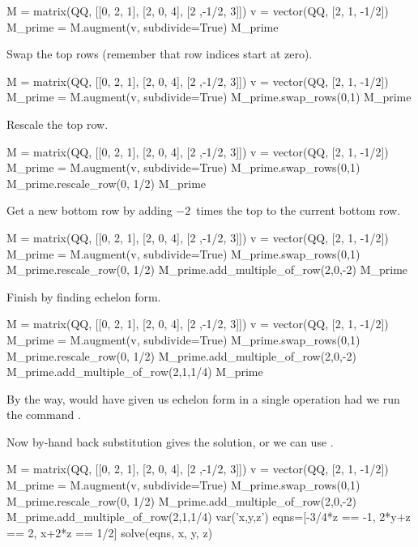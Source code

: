 \begin{sageoutput}
M = matrix(QQ, [[0, 2, 1], [2, 0, 4], [2 ,-1/2, 3]])
v = vector(QQ, [2, 1, -1/2])                        
M_prime = M.augment(v, subdivide=True)              
M_prime                                             
\end{sageoutput}
\noindent
Swap the top rows (remember that row indices start at zero).
\begin{sageoutput}[d,0,3]
M = matrix(QQ, [[0, 2, 1], [2, 0, 4], [2 ,-1/2, 3]])
v = vector(QQ, [2, 1, -1/2])                        
M_prime = M.augment(v, subdivide=True)              
M_prime.swap_rows(0,1)
M_prime
\end{sageoutput}
\noindent
Rescale the top row.
\begin{sageoutput}[d,0,4]
M = matrix(QQ, [[0, 2, 1], [2, 0, 4], [2 ,-1/2, 3]])
v = vector(QQ, [2, 1, -1/2])                        
M_prime = M.augment(v, subdivide=True)              
M_prime.swap_rows(0,1)
M_prime.rescale_row(0, 1/2)
M_prime
\end{sageoutput}
\noindent
Get a new  bottom row by adding $-2$~times the top to the current bottom
row.
\begin{sageoutput}[d,0,5]
M = matrix(QQ, [[0, 2, 1], [2, 0, 4], [2 ,-1/2, 3]])
v = vector(QQ, [2, 1, -1/2])                        
M_prime = M.augment(v, subdivide=True)              
M_prime.swap_rows(0,1)
M_prime.rescale_row(0, 1/2)
M_prime.add_multiple_of_row(2,0,-2)
M_prime
\end{sageoutput}
\noindent
Finish by finding echelon form.
\begin{sageoutput}[d,0,6]
M = matrix(QQ, [[0, 2, 1], [2, 0, 4], [2 ,-1/2, 3]])
v = vector(QQ, [2, 1, -1/2])                        
M_prime = M.augment(v, subdivide=True)              
M_prime.swap_rows(0,1)
M_prime.rescale_row(0, 1/2)
M_prime.add_multiple_of_row(2,0,-2)
M_prime.add_multiple_of_row(2,1,1/4)
M_prime                             
\end{sageoutput}
\noindent
By the way,
\Sage{} would have given us echelon form in a single operation 
had we run the command
.

Now by-hand back substitution gives the solution, or we can 
use .
\begin{sageoutput}[d,0,7]
M = matrix(QQ, [[0, 2, 1], [2, 0, 4], [2 ,-1/2, 3]])
v = vector(QQ, [2, 1, -1/2])                        
M_prime = M.augment(v, subdivide=True)              
M_prime.swap_rows(0,1)
M_prime.rescale_row(0, 1/2)
M_prime.add_multiple_of_row(2,0,-2)
M_prime.add_multiple_of_row(2,1,1/4)
var('x,y,z')
eqns=[-3/4*z == -1, 2*y+z == 2, x+2*z == 1/2]
solve(eqns, x, y, z)
\end{sageoutput}

